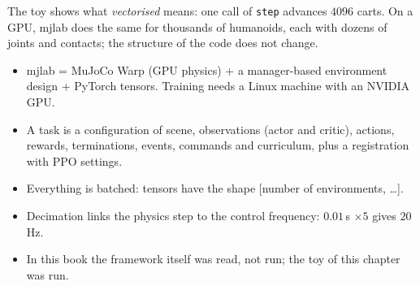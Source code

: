 \begin{center}
\end{center}

The toy shows what \emph{vectorised} means: one call of \verb!step! advances $4096$ carts. On a GPU, mjlab does the same for thousands of humanoids, each with dozens of joints and contacts; the structure of the code does not change.

\begin{keyidea}[Summary]
\begin{itemize}[nosep]
 \item mjlab = MuJoCo Warp (GPU physics) + a manager-based environment design + PyTorch tensors. Training needs a Linux machine with an NVIDIA GPU.
 \item A task is a configuration of scene, observations (actor and critic), actions, rewards, terminations, events, commands and curriculum, plus a registration with PPO settings.
 \item Everything is batched: tensors have the shape [number of environments, \dots].
 \item Decimation links the physics step to the control frequency: $0.01$\,s $\times 5$ gives $20$\,Hz.
 \item In this book the framework itself was read, not run; the toy of this chapter was run.
\end{itemize}
\end{keyidea}

